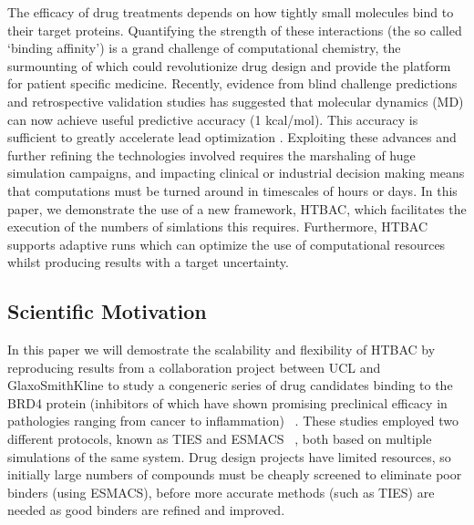 \documentclass[conference]{IEEEtran}
\begin{document}
The efficacy of drug treatments depends on how tightly small molecules bind 
to their target proteins. 
Quantifying the strength of these interactions (the so called ‘binding 
affinity’) is a grand challenge of computational chemistry, the surmounting 
of which could revolutionize drug design and provide the platform for patient 
specific medicine.
Recently, evidence from blind challenge predictions and retrospective 
validation studies has suggested that molecular dynamics (MD) can now achieve useful 
predictive accuracy (1 kcal/mol)\cite{shirts-mobley-chodera:2007:annu-rep-comput-chem:prime-time, abel:jacs:2015:fep-plus}. 
This accuracy is sufficient to greatly accelerate lead optimization \cite{shirts-mobley-brown:2009:sbdd}.
Exploiting these advances and further refining the technologies involved 
requires the marshaling of huge simulation campaigns, and impacting clinical or 
industrial decision making means that computations must be turned around in 
timescales of hours or days.
In this paper, we demonstrate the use of a new framework, HTBAC, which 
facilitates the execution of the numbers of simlations this requires.
Furthermore, HTBAC supports adaptive runs which can optimize the use of 
computational resources whilst producing results with a target uncertainty.



\subsection{Scientific Motivation}\label{sec:motivation}

In this paper we will demostrate the scalability and flexibility of HTBAC by 
reproducing results from a collaboration project between UCL
and GlaxoSmithKline to study a congeneric series of drug candidates binding 
to the BRD4 protein (inhibitors of which have shown promising preclinical
efficacy in pathologies ranging from cancer to inflammation)
~\cite{Wan2017brd4}. 
These studies employed two different protocols, known as TIES and ESMACS
~\cite{Bhati2017}, both based on multiple simulations of the same system.
Drug design projects have limited resources, so initially large numbers of 
compounds must be cheaply screened to eliminate poor binders (using ESMACS), 
before more accurate methods (such as TIES) are needed as good binders are 
refined and improved.
\end{document}
